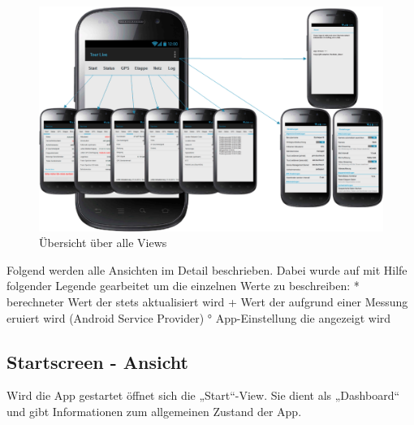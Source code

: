 \begin{figure}[H]
	\centering\includegraphics[width=130mm]{images/android/OverviewAndroid.png} 
	\caption{Übersicht über alle Views}
\end{figure}
 
Folgend werden alle Ansichten im Detail beschrieben. Dabei wurde auf mit Hilfe folgender Legende gearbeitet um die einzelnen Werte zu beschreiben:
* 	berechneter Wert der stets aktualisiert wird
+	Wert der aufgrund einer Messung eruiert wird (Android Service Provider)
°	App-Einstellung die angezeigt wird

\subsection{Startscreen - Ansicht}
Wird die App gestartet öffnet sich die „Start“-View. Sie dient als „Dashboard“ und gibt Informationen zum allgemeinen Zustand der App. 

